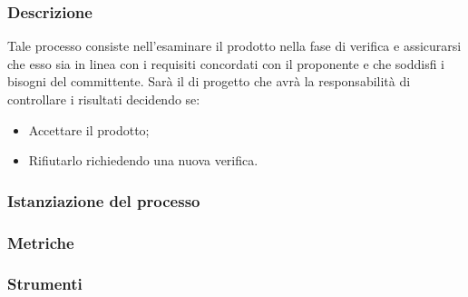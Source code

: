 \subsubsection{Descrizione}
Tale processo consiste nell'esaminare il prodotto nella fase di verifica e assicurarsi che esso sia in linea con i requisiti concordati con il proponente e che soddisfi i bisogni del committente.
Sarà il \roleProjectManagerLow{} di progetto che avrà la responsabilità di controllare i risultati decidendo se:
\begin{itemize}
    \item Accettare il prodotto;
    \item Rifiutarlo richiedendo una nuova verifica.
\end{itemize}

\subsubsection{Istanziazione del processo}
\subsubsection{Metriche}
\subsubsection{Strumenti}